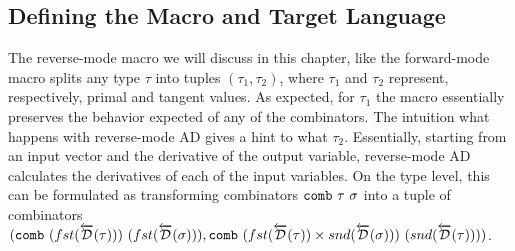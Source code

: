 \subsection{Defining the Macro and Target Language}\label{sec:combinator-macro}
  The reverse-mode macro we will discuss in this chapter, like the forward-mode macro splits any type $\tau$ into tuples $(\tau_1, \tau_2)$, where $\tau_1$ and $\tau_2$ represent, respectively, primal and tangent values.
  As expected, for $\tau_1$ the macro essentially preserves the behavior expected of any of the combinators.
  The intuition what happens with reverse-mode AD gives a hint to what $\tau_2$.
  Essentially, starting from an input vector and the derivative of the output variable, reverse-mode AD calculates the derivatives of each of the input variables.
  On the type level, this can be formulated as transforming combinators $\texttt{comb}\ \tau\ \sigma$ into a tuple of combinators $(\texttt{comb}\ (fst(\overleftarrow{\mathcal{D}}(\tau)))\ (fst(\overleftarrow{\mathcal{D}}(\sigma))), \texttt{comb}\ (fst(\overleftarrow{\mathcal{D}}(\tau)) \times snd(\overleftarrow{\mathcal{D}}(\sigma)))\ (snd(\overleftarrow{\mathcal{D}}(\tau))))$.


